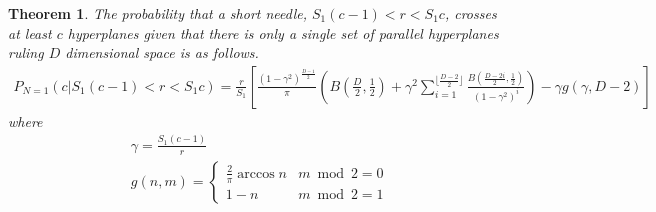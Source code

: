 \documentclass{article}
\newtheorem{theorem}{Theorem}
\begin{document}
\begin{theorem} \label{t:short needle}
	The probability that a short needle, $S_1(c-1)<r<S_1c$, crosses at least $c$ hyperplanes given that there is only
	a single set of parallel hyperplanes ruling $D$ dimensional space is as follows.
	\begin{gather}
		P_{N=1}(c|S_1(c-1)<r<S_1c) = \frac{r}{S_1} \left[\frac{(1-\gamma^2)^{\frac{D-1}{2}}}{\pi} \left(B\left(\frac{D}{2}, \frac{1}{2} \right) + \gamma^2 \sum_{i=1}^{\lfloor \frac{D-2}{2} \rfloor}\frac{B(\frac{D-2i}{2}, \frac{1}{2})}{(1-\gamma^2)^i}\right) - \gamma g(\gamma, D-2) \right]
	\end{gather}
	where
	\begin{gather}
		\gamma = \frac{S_1(c-1)}{r} \\
		g(n, m)=\begin{cases}
			\frac{2}{\pi}\arccos n & m \bmod 2=0 \\
			1 - n & m \bmod 2=1
		\end{cases}
	\end{gather}
\end{theorem}
\end{document}
